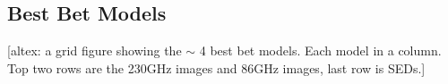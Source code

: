 \subsection{Best Bet Models}

\begin{figure*}
    \centering
    [altex: a grid figure showing the $\sim$ 4 best bet models.  Each model in a column.  Top two rows are the 230GHz images and 86GHz images, last row is SEDs.]
    \caption{Best bet models.  Each column corresponds to one best bet model, top row shows the 230GHz image, middle row shows the 86GHz images, and the bottle row shows the SEDs.}
    \label{fig:my_label}
\end{figure*}
